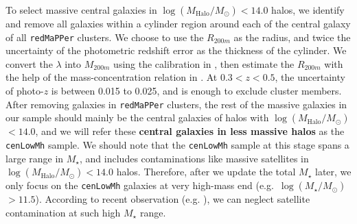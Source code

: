 \documentclass{emulateapj}
\def\redm{\texttt{redMaPPer}}
\def\nbcg{\texttt{cenLowMh}}
\def\mstar{{$M_{\star}$}}
\def\logms{{$\log (M_{\star}/M_{\odot})$}}
\def\logmh{{$\log (M_{\mathrm{Halo}}/M_{\odot})$}}
\newcommand{\alexie}[1]{\textcolor{blue}{\textbf{[Alexie: #1]}}}
\begin{document}
\begin{CJK*}{UTF8}{gbsn}
    To select massive central galaxies in \logmh{}$<14.0$ halos, we identify and 
    remove all galaxies within a cylinder region around each of the central galaxy of 
    all \redm{} clusters.
    We choose to use the $R_{200m}$ as the radius, and twice the uncertainty of the 
    photometric redshift error as the thickness of the cylinder. 
    We convert the $\lambda$ into $M_{200m}$ using the calibration in 
    \citep{Simet2016}, then estimate the $R_{200m}$ with the help of the 
    mass-concentration relation in \citep{Diemer2015}. 
    At $0.3 < z < 0.5$, the uncertainty of photo-$z$ is between 0.015 to 0.025, 
    and is enough to exclude cluster members.
    After removing galaxies in \redm{} clusters, the rest of the massive galaxies 
    in our sample should mainly be the central galaxies of halos with \logmh{}$<14.0$,
    and we will refer these \textbf{central galaxies in less massive halos} as the 
    \nbcg{} sample.
    We should note that the \nbcg{} sample at this stage spans a large range in 
    \mstar{}, and includes contaminations like massive satellites in \logmh{}$< 14.0$ 
    halos.  
    Therefore, after we update the total \mstar{} later, we only focus on the 
    \nbcg{} galaxies at very high-mass end (e.g.~\logms{}$ > 11.5$). 
    According to recent observation (e.g. \citealt{vanUitert2016}), we can neglect 
    satellite contamination at such high \mstar{} range. 
    


\end{CJK*}
\end{document}
